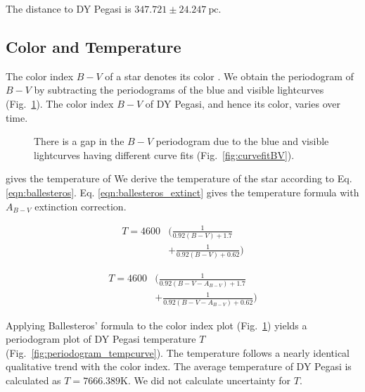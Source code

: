 \documentclass[twocolumn]{aastex631}
\begin{document}
The distance to DY Pegasi is $347.721 \pm 24.247 \ \mathrm{pc}$.


\subsection{Color and Temperature\label{subsec:color_temperature}}

The color index $B-V$ of a star denotes its color \citep{Fitzgerald_1970}. We obtain the periodogram of $B-V$ by subtracting the periodograms of the blue and visible lightcurves (Fig.\ \ref{fig:colorindexcurve}). The color index $B-V$ of DY Pegasi, and hence its color, varies over time. 

\begin{figure}
\caption{There is a gap in the $B-V$ periodogram due to the blue and visible lightcurves having different curve fits (Fig.\ \ref{fig:curvefitBV}). \label{fig:colorindexcurve}}
\end{figure}

\citet{Ballesteros_2012} gives the temperature of We derive the temperature of the star according to Eq. \ref{eqn:ballesteros}. Eq. \ref{eqn:ballesteros_extinct} gives the temperature formula with $A_{B-V}$ extinction correction.

\begin{equation}\label{eqn:ballesteros}
\begin{split}
    T = 4600 &\Bigg( \frac{1}{0.92(B-V) + 1.7} \\
                & + \frac{1}{0.92(B-V) + 0.62} \Bigg)
\end{split}
\end{equation}

\begin{equation}
\begin{split} \label{eqn:ballesteros_extinct}
    T = 4600 &\Bigg( \frac{1}{0.92(B-V - A_{B-V}) + 1.7} \\
                & + \frac{1}{0.92(B-V - A_{B-V}) + 0.62} \Bigg)
\end{split}
\end{equation}

Applying Ballesteros' formula to the color index plot (Fig.\ \ref{fig:colorindexcurve}) yields a periodogram plot of DY Pegasi temperature $T$ (Fig.\ \ref{fig:periodogram_tempcurve}). The temperature follows a nearly identical qualitative trend with the color index. The average temperature of DY Pegasi is calculated as $T = 7666.389 \mathrm{K}$. We did not calculate uncertainty for $T$.
\end{document}
